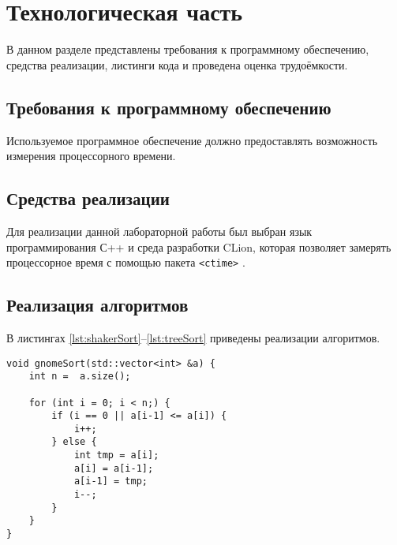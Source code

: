 \chapter{Технологическая часть}

В данном разделе представлены требования к программному обеспечению, средства реализации, листинги кода и проведена оценка трудоёмкости.

\section{Требования к программному \newline обеспечению}

Используемое программное обеспечение должно предоставлять возможность измерения процессорного времени.

\section{Средства реализации}

Для реализации данной лабораторной работы был выбран язык программирования С++ \cite{c} и среда разработки CLion, которая позволяет замерять процессорное время с помощью пакета \texttt{<ctime>} \cite{ctime}.

\section{Реализация алгоритмов}

В листингах \ref{lst:shakerSort}--\ref{lst:treeSort} приведены реализации алгоритмов.

\clearpage
\begin{lstlisting}[label=lst:gnomeSort,caption=Функция гномьей сортировки]
void gnomeSort(std::vector<int> &a) {
	int n =  a.size();
	
	for (int i = 0; i < n;) {
		if (i == 0 || a[i-1] <= a[i]) {
			i++;
		} else {
			int tmp = a[i];
			a[i] = a[i-1];
			a[i-1] = tmp;
			i--;
		}
	}
}	
\end{lstlisting}
